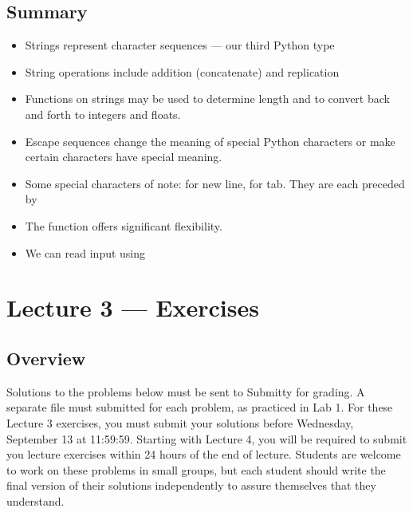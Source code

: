\documentclass[letterpaper,10pt,english]{sphinxmanual}
\begin{document}
\section{Summary}
\label{\detokenize{lecture_notes/lec03_strings:summary}}\begin{itemize}
\item {} 
Strings represent character sequences — our third Python type

\item {} 
String operations include addition (concatenate) and replication

\item {} 
Functions on strings may be used to determine length and to convert
back and forth to integers and floats.

\item {} 
Escape sequences change the meaning of special Python characters or
make certain characters have special meaning.

\item {} 
Some special characters of note:  for new line,  for tab.
They are each preceded by \sphinxcode{\sphinxupquote{\textbackslash{}}}

\item {} 
The  function offers significant flexibility.

\item {} 
We can read input using 

\end{itemize}


\chapter{Lecture 3 — Exercises}
\label{\detokenize{lecture_notes/lec03_strings_exercises/exercises:lecture-3-exercises}}\label{\detokenize{lecture_notes/lec03_strings_exercises/exercises::doc}}

\section{Overview}
\label{\detokenize{lecture_notes/lec03_strings_exercises/exercises:overview}}
Solutions to the problems below must be sent to Submitty for grading.
A separate file must submitted for each problem, as practiced in
Lab 1.  For these Lecture 3 exercises, you must submit your
solutions before Wednesday, September 13 at 11:59:59. Starting with Lecture 4,
you will be required to submit you lecture exercises within 24 hours
of the end of lecture.  Students are
welcome to work on these problems in small groups, but each student
should write the final version of their solutions independently to
assure themselves that they understand.
\end{document}

